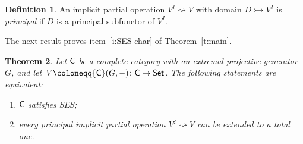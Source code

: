 \documentclass[a4paper,10pt,reqno]{amsart}
\newtheorem{theorem}{Theorem}[section]
\theoremstyle{definition}
\newtheorem{definition}[theorem]{Definition}
\theoremstyle{remark}
\newcommand{\cat}{{\sf C}}								%
\newcommand{\Set}{{\sf Set}}							%
\newcommand{\SES}{\textnormal{SES}}
\begin{document}
\begin{definition}
An implicit partial operation $V^{I} \rightsquigarrow V$ with domain $D\rightarrowtail V^{I}$ is \emph{principal} if $D$ is a principal subfunctor of $V^I$.
\end{definition}

The next result proves item~\ref{i:SES-char} of Theorem~\ref{t:main}.

\begin{theorem}\label{t:SES-vs-implicit-product-pres-operations}
Let $\cat$ be a complete category with an extremal projective generator~$G$, and let~$V\coloneqq\cat(G,-)\colon\cat\to\Set$.  The following statements are equivalent:
%
\begin{enumerate}[label=(\arabic*),series=implicitops-SES]
\item\label{i:Cat-satisfies-SES} $\cat$ satisfies \SES;
\item\label{i:prod-pres-admits-extension} every principal implicit partial operation $V^{I} \rightsquigarrow V$ can be extended to a total one.
\end{enumerate}
\end{theorem}
\end{document}
